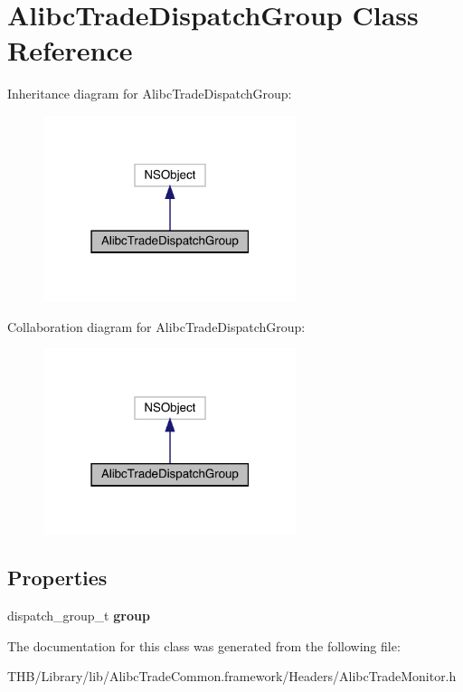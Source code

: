 \hypertarget{interface_alibc_trade_dispatch_group}{}\section{Alibc\+Trade\+Dispatch\+Group Class Reference}
\label{interface_alibc_trade_dispatch_group}


Inheritance diagram for Alibc\+Trade\+Dispatch\+Group\+:\nopagebreak
\begin{figure}[H]
\begin{center}
\leavevmode
\includegraphics[width=210pt]{interface_alibc_trade_dispatch_group__inherit__graph}
\end{center}
\end{figure}


Collaboration diagram for Alibc\+Trade\+Dispatch\+Group\+:\nopagebreak
\begin{figure}[H]
\begin{center}
\leavevmode
\includegraphics[width=210pt]{interface_alibc_trade_dispatch_group__coll__graph}
\end{center}
\end{figure}
\subsection*{Properties}
\begin{DoxyCompactItemize}
\item 
\mbox{\label{interface_alibc_trade_dispatch_group_a2daa8193f04328cbf770d2007546e1dc}} 
dispatch\+\_\+group\+\_\+t {\bfseries group}
\end{DoxyCompactItemize}


The documentation for this class was generated from the following file\+:\begin{DoxyCompactItemize}
\item 
T\+H\+B/\+Library/lib/\+Alibc\+Trade\+Common.\+framework/\+Headers/Alibc\+Trade\+Monitor.\+h\end{DoxyCompactItemize}
